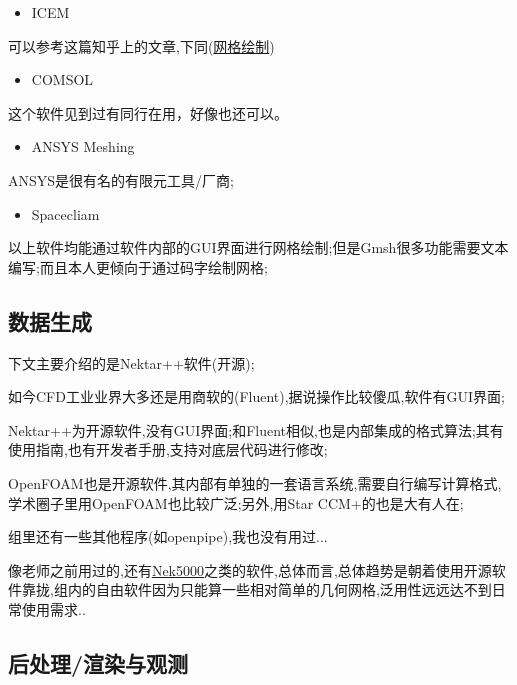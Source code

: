 \begin{itemize}
	\item{ICEM}
\end{itemize}
\par 可以参考这篇知乎上的文章,下同(\href{https://zhuanlan.zhihu.com/p/671219971}{网格绘制})

\begin{itemize}
	\item{COMSOL}
\end{itemize}
\par 这个软件见到过有同行在用，好像也还可以。

\begin{itemize}
	\item{ANSYS Meshing}
\end{itemize}
\par ANSYS是很有名的有限元工具/厂商;

\begin{itemize}
	\item{Spacecliam}
\end{itemize}
\par 以上软件均能通过软件内部的GUI界面进行网格绘制;但是Gmsh很多功能需要文本编写;而且本人更倾向于通过码字绘制网格;

\subsection{数据生成}

下文主要介绍的是Nektar++软件(开源);\par

如今CFD工业业界大多还是用商软的(Fluent),据说操作比较傻瓜,软件有GUI界面;\par
Nektar++为开源软件,没有GUI界面;和Fluent相似,也是内部集成的格式算法;其有使用指南,也有开发者手册,支持对底层代码进行修改;\par
OpenFOAM也是开源软件,其内部有单独的一套语言系统,需要自行编写计算格式,学术圈子里用OpenFOAM也比较广泛;另外,用Star CCM+的也是大有人在;\par
组里还有一些其他程序(如openpipe),我也没有用过...\par
像老师之前用过的,还有\href{https://nek5000.mcs.anl.gov/}{Nek5000}之类的软件,总体而言,总体趋势是朝着使用开源软件靠拢,组内的自由软件因为只能算一些相对简单的几何网格,泛用性远远达不到日常使用需求..

\subsection{后处理/渲染与观测}

